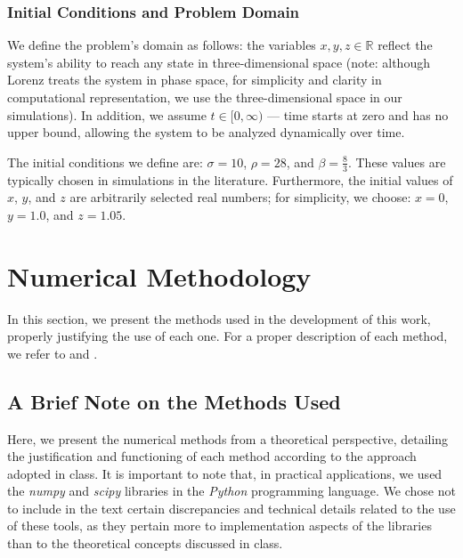 \documentclass[12pt, a4paper]{article}
\begin{document}
\subsubsection{Initial Conditions and Problem Domain}
\label{sec:cond-ini}

We define the problem's domain as follows: the variables $x, y, z \in \mathbb{R}$ reflect the system's ability to reach any state in three-dimensional space (note: although Lorenz treats the system in phase space, for simplicity and clarity in computational representation, we use the three-dimensional space in our simulations). In addition, we assume $t \in [0, \infty)$ — time starts at zero and has no upper bound, allowing the system to be analyzed dynamically over time.
	
	The initial conditions we define are: $\sigma = 10$, $\rho = 28$, and $\beta = \frac{8}{3}$. These values are typically chosen in simulations in the literature. Furthermore, the initial values of $x$, $y$, and $z$ are arbitrarily selected real numbers; for simplicity, we choose: $x = 0$, $y = 1.0$, and $z = 1.05$.
	\newpage
	
	
	\section{Numerical Methodology}
	
	In this section, we present the methods used in the development of this work, properly justifying the use of each one. For a proper description of each method, we refer to \cite{roma2023} and \cite{burden2016}.
	
	\subsection{A Brief Note on the Methods Used}
	
	Here, we present the numerical methods from a theoretical perspective, detailing the justification and functioning of each method according to the approach adopted in class. It is important to note that, in practical applications, we used the \textit{numpy} and \textit{scipy} libraries in the \textit{Python} programming language. We chose not to include in the text certain discrepancies and technical details related to the use of these tools, as they pertain more to implementation aspects of the libraries than to the theoretical concepts discussed in class.
	
\end{document}
